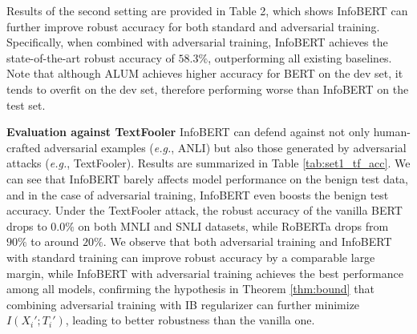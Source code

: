 \documentclass{article} \usepackage{iclr2021_conference,times}
\theoremstyle{definition}
\theoremstyle{remark}
\newcommand{\method}{InfoBERT\xspace}
\begin{document}
Results of the second setting are provided in Table 2, which shows \method can further improve robust accuracy for both standard and adversarial training. Specifically, when combined with adversarial training, \method achieves the state-of-the-art robust accuracy of $58.3\%$, outperforming all 
existing baselines. Note that although ALUM achieves higher accuracy for BERT on the dev set, it tends to overfit on the dev set, therefore performing  worse than \method on the test set. 

\textbf{Evaluation against TextFooler} \method can defend against not only human-crafted adversarial examples (\emph{e.g.}, ANLI) but also those generated by adversarial attacks (\emph{e.g.}, TextFooler). Results are summarized in Table \ref{tab:set1_tf_acc}. We can see that \method barely affects model performance on the benign test data, and in the case of adversarial training, \method even boosts the benign test accuracy. Under the TextFooler attack, the robust accuracy of the vanilla BERT drops to $0.0\%$ on both MNLI and SNLI datasets, while RoBERTa drops from $90\%$ to around $20\%$. We observe that both adversarial training and \method with standard training can improve robust accuracy by a comparable large margin, while \method with adversarial training achieves the best performance among all models, confirming the hypothesis in Theorem \ref{thm:bound} that combining adversarial training with IB regularizer can further minimize $I(X_i';T_i')$,  leading to better robustness than the vanilla one.
\end{document}
